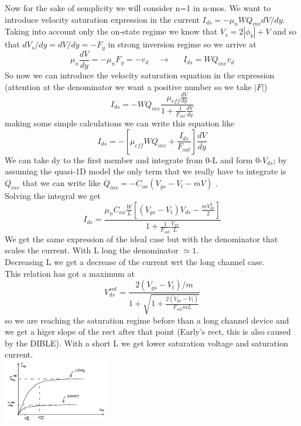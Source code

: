 Now for the sake of semplicity we will consider n=1 in n-mos. We want to introduce velocity saturation expression in the current $I_{ds}=-\mu_nWQ_{inv}dV/dy$. Taking into account only the on-state regime we know that $V_s=2|\phi_b|+V$ and so that $dV_s/dy=dV/dy=-F_{y}$ in strong inversion regime so we arrive at 
\begin{equation}
\mu_n \frac{dV}{dy}=-\mu_nF_y=-v_d \ \ \ \ \ \rightarrow  \ \ \ \ \ \ \ I_{ds}=WQ_{inv}v_d
\end{equation}
So now we can introduce the velocity saturation equation in the expression (attention at the denominator we want a positive number so we take $|F|$)
\begin{equation}
I_{ds}=-WQ_{inv}\frac{\mu_{eff}\frac{dV}{dy}}{1+\frac{1}{F_{sat}}\frac{dV}{dy}}
\end{equation}
making some simple calculations we can write this equation like
\begin{equation}
I_{ds}=-[\mu_{eff}WQ_{inv}+\frac{I_{ds}}{F_{sat}}]\frac{dV}{dy}
\end{equation}
We can take dy to the first member and integrate from 0-L and form 0-$V_{ds}$; by assuming the quasi-1D model the only term that we really have to integrate is $Q_{inv}$ that we can write like $Q_{inv}=-C_{ox}(V_{gs}-V_t-mV)$ .\\
Solving the integral we get
\begin{equation}
I_{ds}=\frac{\mu_nC_{ox}\frac{W}{L}[(V_{gs}-V_t)V_{ds}-\frac{mV_{ds}^2}{2}]}{1+\frac{1}{F_{sat}}\frac{V_{ds}}{L}}
\end{equation}
We get the same expression of the ideal case but with the denominator that scales the current. With L long the denominator $\simeq 1$.\\
Decreasing L we get a decrease of the current wrt the long channel case.\\
This relation has got a maximum at 
\begin{equation}
V_{ds}^{sat}=\frac{2(V_{gs}-V_t)/m}{1+\sqrt{1+\frac{2(V_{gs}-V_t)}{F_{sat}mL}}}
\end{equation}
so we are reaching the saturation regime before than a long channel device and we get a higer slope of the rect after that point (Early's rect, this is also caused by the DIBLE). With a short L we get lower saturation voltage and saturation current.\\

\centering
\includegraphics[width=0.35\textwidth]{ls.png}\\ %
\raggedright


